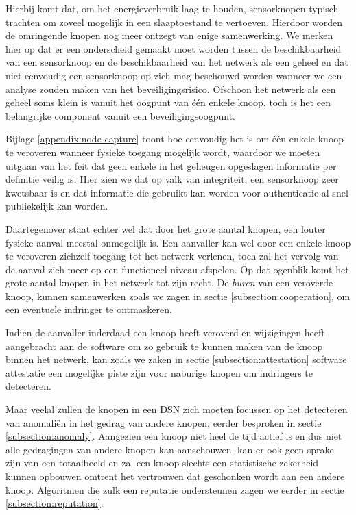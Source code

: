 Hierbij komt dat, om het energieverbruik laag te houden, sensorknopen typisch
trachten om zoveel mogelijk in een slaaptoestand te vertoeven. Hierdoor worden
de omringende knopen nog meer ontzegt van enige samenwerking. We merken hier op
dat er een onderscheid gemaakt moet worden tussen de beschikbaarheid van een
sensorknoop en de beschikbaarheid van het netwerk als een geheel en dat niet
eenvoudig een sensorknoop op zich mag beschouwd worden wanneer we een analyse
zouden maken van het beveiligingsrisico. Ofschoon het netwerk als een geheel
soms klein is vanuit het oogpunt van \'e\'en enkele knoop, toch is het een
belangrijke component vanuit een beveiligingsoogpunt.

Bijlage \ref{appendix:node-capture} toont hoe eenvoudig het is om \'e\'en enkele
knoop te veroveren wanneer fysieke toegang mogelijk wordt, waardoor we moeten
uitgaan van het feit dat geen enkele in het geheugen opgeslagen informatie per
definitie veilig is. Hier zien we dat op valk van integriteit, een sensorknoop
zeer kwetsbaar is en dat informatie die gebruikt kan worden voor authenticatie
al snel publiekelijk kan worden.

Daartegenover staat echter wel dat door het grote aantal knopen, een louter
fysieke aanval meestal onmogelijk is. Een aanvaller kan wel door een enkele
knoop te veroveren zichzelf toegang tot het netwerk verlenen, toch zal het
vervolg van de aanval zich meer op een functioneel niveau afspelen. Op dat
ogenblik komt het grote aantal knopen in het netwerk tot zijn recht. De
\emph{buren} van een veroverde knoop, kunnen samenwerken zoals we zagen in
sectie \ref{subsection:cooperation}, om een eventuele indringer te ontmaskeren.

Indien de aanvaller inderdaad een knoop heeft veroverd en wijzigingen heeft
aangebracht aan de software om zo gebruik te kunnen maken van de knoop binnen
het netwerk, kan zoals we zaken in sectie \ref{subsection:attestation} software
attestatie een mogelijke piste zijn voor naburige knopen om indringers te
detecteren.

Maar veelal zullen de knopen in een DSN zich moeten focussen op het detecteren
van anomali\"en in het gedrag van andere knopen, eerder besproken in sectie
\ref{subsection:anomaly}. Aangezien een knoop niet heel de tijd actief is en
dus niet alle gedragingen van andere knopen kan aanschouwen, kan er ook geen
sprake zijn van een totaalbeeld en zal een knoop slechts een statistische
zekerheid kunnen opbouwen omtrent het vertrouwen dat geschonken wordt aan een
andere knoop. Algoritmen die zulk een reputatie ondersteunen zagen we eerder in
sectie \ref{subsection:reputation}.

